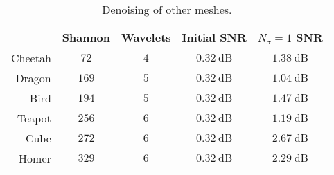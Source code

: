 \begin{table}
	\centering
	\caption{
		Denoising of other meshes.
	}\label{tab:chapter4_denoising}
	\begin{tabular}{@{}rcccc@{}}
		\toprule
		        & Shannon       & Wavelets    & Initial SNR        & \(N_{\sigma}=1\) SNR \\
		\midrule
		Cheetah & \(\num{72}\)  & \(\num{4}\) & \(\SI{0.32}{\dB}\) & \(\SI{1.38}{\dB}\)   \\
		Dragon  & \(\num{169}\) & \(\num{5}\) & \(\SI{0.32}{\dB}\) & \(\SI{1.04}{\dB}\)   \\
		Bird    & \(\num{194}\) & \(\num{5}\) & \(\SI{0.32}{\dB}\) & \(\SI{1.47}{\dB}\)   \\
		Teapot  & \(\num{256}\) & \(\num{6}\) & \(\SI{0.32}{\dB}\) & \(\SI{1.19}{\dB}\)   \\
		Cube    & \(\num{272}\) & \(\num{6}\) & \(\SI{0.32}{\dB}\) & \(\SI{2.67}{\dB}\)   \\
		Homer   & \(\num{329}\) & \(\num{6}\) & \(\SI{0.32}{\dB}\) & \(\SI{2.29}{\dB}\)   \\
		\bottomrule
	\end{tabular}
\end{table}

